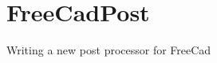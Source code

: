 \chapter{Free\+Cad\+Post}
\hypertarget{md__r_e_a_d_m_e}{}\label{md__r_e_a_d_m_e}
\label{md__r_e_a_d_m_e_autotoc_md2}%
%
Writing a new post processor for Free\+Cad 